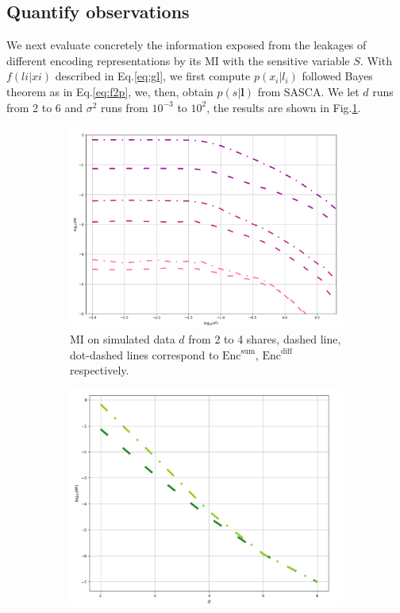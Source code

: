 \documentclass{llncs}
\begin{document}
	\subsection{Quantify observations}
	We next evaluate concretely the information exposed from the leakages of different encoding representations by its MI with the sensitive variable $S$. With $f(li|xi)$ described in Eq.\ref{eq:gl}, we first compute $p(x_i|l_i)$ followed Bayes theorem as in Eq.\ref{eq:f2p}, we, then, obtain $p(s|\bm{l})$ from SASCA. We let $d$ runs from 2 to 6 and $\sigma^2$ runs from $10^{-3}$ to $10^2$, the results are shown in Fig.\ref{fig:mi234}.
	\begin{figure}[h]
		
		\begin{subfigure}{0.5\textwidth}
			\includegraphics[scale=0.14]{figures/mi_234.png} 
			\caption{MI on simulated data $d$ from  2 to 4 shares, dashed line, dot-dashed lines correspond to $\text{Enc}^{\text{sum}}$, $\text{Enc}^{\text{diff}}$ respectively.}\label{fig:mi234}
		\end{subfigure}
		\begin{subfigure}{0.5\textwidth}
			\includegraphics[scale=0.16]{figures/mi_lines_modes.png} 

\end{subfigure}
\end{figure}
\end{document}

